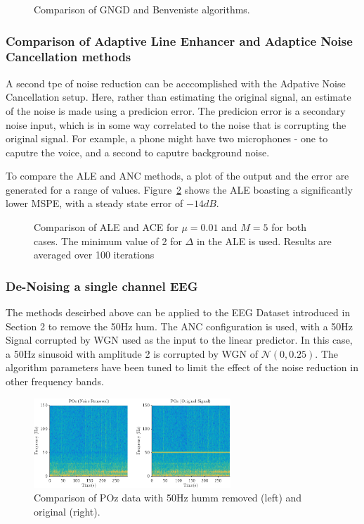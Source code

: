 \documentclass[main.tex]{subfiles}
\begin{document}
\begin{figure}[H]
	\centering 
	\resizebox{0.7\textwidth}{!}{}
	\caption{Comparison of GNGD and Benveniste algorithms.}
	\label{fig:q3_3_b}
\end{figure}


\subsubsection{Comparison of Adaptive Line Enhancer and Adaptice Noise Cancellation methods}

A second tpe of noise reduction can be acccomplished with the Adpative Noise Cancellation setup. Here, rather than estimating the original signal, an estimate of the noise is made using a predicion error. The predicion error is a secondary noise input, which is in some way correlated to the noise that is corrupting the original signal. For example, a phone might have two microphones - one to caputre the voice, and a second to caputre background noise.

To compare the ALE and ANC methods, a plot of the output and the error are generated for a range of values. Figure~\ref{fig:q3_3_c} shows the ALE boasting a significantly lower MSPE, with a steady state error of $-14dB$.

\begin{figure}[H]
	\centering 
	\resizebox{0.7\textwidth}{!}{}
	\caption{Comparison of ALE and ACE for $\mu = 0.01$ and $M = 5$ for both cases. The minimum value of 2 for $\Delta$ in the ALE is used. Results are averaged over 100 iterations}
	\label{fig:q3_3_c}
\end{figure}


\subsubsection{De-Noising a single channel EEG}

The methods descirbed above can be applied to the EEG Dataset introduced in Section 2 to remove the 50Hz hum. The ANC configuration is used, with a 50Hz Signal corrupted by WGN used as the input to the linear predictor. In this case, a 50Hz sinusoid with amplitude 2 is corrupted by WGN of $\mathcal{N}(0,0.25)$. The algorithm parameters have been tuned to limit the effect of the noise reduction in other frequency bands.

\begin{figure}[H]
	\centering
	\includegraphics[width=0.66\textwidth]{images/test.png}
	\caption{Comparison of POz data with 50Hz humm removed (left) and original (right).}
	\label{fig:3-3-d-1}
\end{figure}
\end{document}
